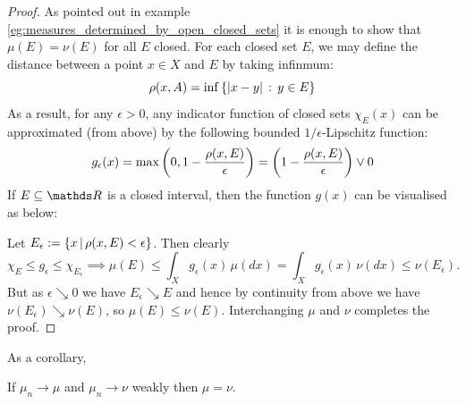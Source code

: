 \begin{proof}
As pointed out in example \ref{eg:measures_determined_by_open_closed_sets} it is enough to show that $\mu(E) = \nu(E)$ for all $E$ closed. For each closed set $E$, we may define the distance between a point $x \in X$ and $E$ by taking infinmum:
\begin{equation}
    \rho(x,A) = \inf\left\{ |x-y| \,:\, y \in E \right \}
\end{equation}
As a result, for any $\epsilon > 0$, any indicator function of closed sets $\chi_E(x)$ can be approximated (from above) by the following bounded $1/\epsilon$-Lipschitz function:
\begin{equation} \label{eq:Lipschitz_approx_indicator}
g_\epsilon(x) = \max\left( 0, 1-\frac{\rho(x,E)}{\epsilon} \right) = \left( 1-\frac{\rho(x,E)}{\epsilon} \right) \vee 0
\end{equation}
If $E \subseteq \R$ is a closed interval, then the function $g(x)$ can be visualised as below:
\begin{center}
    
\end{center}
Let $E_\epsilon := \left\{ x \,|\, \rho(x,E) < \epsilon \right \}$. Then clearly 
\begin{equation*}
    \chi_E \leq g_\epsilon \leq \chi_{E_\epsilon} \implies \mu(E) \leq \int_X g_\epsilon(x) \, \mu(dx) = \int_X g_\epsilon(x) \, \nu(dx) \leq \nu(E_\epsilon).
\end{equation*}
But as $\epsilon \searrow 0$ we have $E_\epsilon \searrow E$ and hence by continuity from above we have $\nu(E_\epsilon) \searrow \nu(E)$, so $\mu(E) \leq \nu(E)$. Interchanging $\mu$ and $\nu$ completes the proof.
\end{proof}

As a corollary, 
\begin{corollary}
If $\mu_n \to \mu$ and $\mu_n \to \nu$ weakly then $\mu = \nu$.
\end{corollary}

